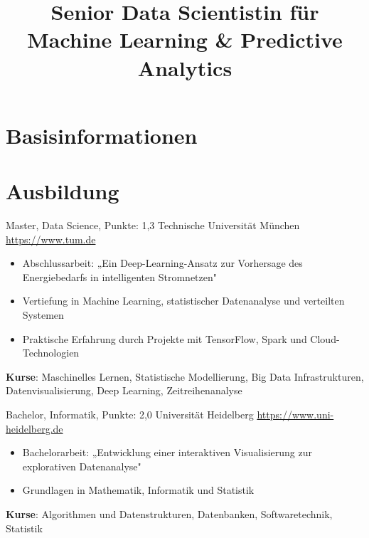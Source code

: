 \documentclass[a4paper, serif, 10pt]{moderncv}
\title{Senior Data Scientistin für Machine Learning \& Predictive Analytics}
\begin{document}
\maketitle

\section{Basisinformationen}

\section{Ausbildung}

        {Master, Data Science, Punkte: 1,3}
        {Technische Universität München}
        {\url{https://www.tum.de}}
        {}
        {\begin{itemize}
\item Abschlussarbeit: „Ein Deep-Learning-Ansatz zur Vorhersage des Energiebedarfs in intelligenten Stromnetzen"
\item Vertiefung in Machine Learning, statistischer Datenanalyse und verteilten Systemen
\item Praktische Erfahrung durch Projekte mit TensorFlow, Spark und Cloud-Technologien
\end{itemize}
\textbf{Kurse}: Maschinelles Lernen, Statistische Modellierung, Big Data Infrastrukturen, Datenvisualisierung, Deep Learning, Zeitreihenanalyse}

        {Bachelor, Informatik, Punkte: 2,0}
        {Universität Heidelberg}
        {\url{https://www.uni-heidelberg.de}}
        {}
        {\begin{itemize}
\item Bachelorarbeit: „Entwicklung einer interaktiven Visualisierung zur explorativen Datenanalyse"
\item Grundlagen in Mathematik, Informatik und Statistik
\end{itemize}
\textbf{Kurse}: Algorithmen und Datenstrukturen, Datenbanken, Softwaretechnik, Statistik}
\end{document}
